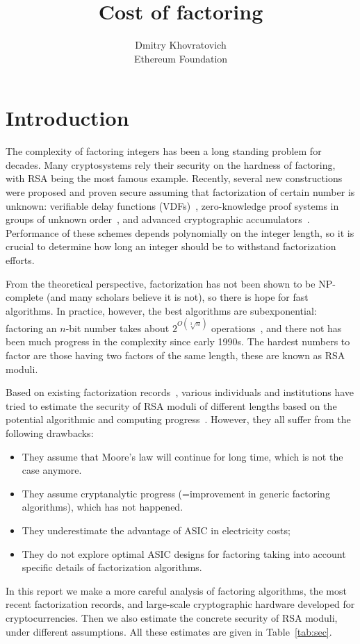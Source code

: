 \documentclass[a4paper]{article}
\title{Cost of factoring}
\author{Dmitry Khovratovich\\Ethereum Foundation}
\begin{document}
\maketitle

\section{Introduction}

The complexity of factoring integers has been a long standing problem for decades. Many cryptosystems rely their security on the hardness of factoring, with RSA being the most famous example. Recently, several new constructions were  proposed and proven  secure assuming that factorization of certain number is unknown: verifiable delay functions (VDFs)~\cite{DBLP:conf/eurocrypt/Wesolowski19,DBLP:conf/crypto/BonehBBF18}, zero-knowledge proof systems in groups of unknown order~\cite{cryptoeprint:2019:1229}, and advanced cryptographic accumulators~\cite{cryptoeprint:2019:1494}. Performance of these schemes depends polynomially on the integer length, so it is crucial to determine how long an integer should be to withstand factorization efforts.

From the theoretical perspective, factorization has not been shown to be NP-complete (and many scholars believe it is not), so there is hope for fast algorithms. In practice, however, the best algorithms are subexponential: factoring an $n$-bit number takes about $2^{O(\sqrt[3]{n})}$ operations~\cite{lenstra1993development}, and there not has been much progress in the complexity since early 1990s. The hardest numbers to factor are those having two factors of the same length, these are known as RSA moduli.

Based on existing factorization records~\cite{DBLP:conf/eurocrypt/CavallarDLLMMRAGGLMMMPPZ00,DBLP:conf/crypto/KleinjungAFLTBGKMORTZ10,DBLP:journals/iacr/BaiTZ12}, various individuals and institutions have tried to estimate the security of RSA moduli of different lengths based on the potential algorithmic and computing progress~\cite{lenstra2001selecting,DBLP:conf/asiacrypt/LenstraTSKDHL03,lenstra2004key,abdalla2016algorithms,barker2016nist}. However, they all suffer from the following drawbacks:
\begin{itemize}
    \item They assume that Moore's law will continue for long time, which is not the case anymore.
    \item They assume cryptanalytic progress (=improvement in generic factoring algorithms), which has not happened.
    \item They underestimate the advantage of ASIC in electricity costs;
    \item They do not explore optimal ASIC designs for factoring taking into account specific details of factorization algorithms.
\end{itemize}
In this report we make a more careful analysis of factoring algorithms, the most recent factorization records, and large-scale cryptographic hardware developed for cryptocurrencies. Then we also estimate the concrete security of RSA moduli, under different assumptions. All these estimates are given in Table~\ref{tab:sec}.
\end{document}

